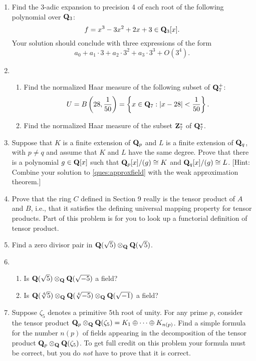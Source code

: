 \begin{enumerate}
\item Find the $3$-adic expansion to precision 4 of each root of the following polynomial over $\mathbf{Q}_3$:
$$
  f = x^3 - 3x^2 + 2x + 3 \in \mathbf{Q}_3[x].
$$
Your solution should conclude with three expressions of the form 
$$a_0 + a_1\cdot 3 + a_2\cdot 3^2 + a_3 \cdot 3^3 + O(3^4).$$

\item
\begin{enumerate}
\item Find the normalized Haar measure of the following subset of 
$\mathbf{Q}_7^+$:
$$
U = B\left(28,\frac{1}{50}\right) = 
\left\lbrace x\in \mathbf{Q}_7 : \left|x-28\right| < \frac{1}{50}\right\rbrace.
$$
\item
Find the normalized Haar measure of the subset $\mathbf{Z}_7^*$ of
$\mathbf{Q}_7^*$.
\end{enumerate} 


\item Suppose that $K$ is a finite extension of $\mathbf{Q}_p$ and $L$
is a finite extension of $\mathbf{Q}_q$, with $p\neq q$ and assume
that $K$ and $L$ have the same degree.  Prove that
there is a polynomial $g\in \mathbf{Q}[x]$ such that $\mathbf{Q}_p[x]/(g)\cong K$
and $\mathbf{Q}_q[x]/(g)\cong L$.  [Hint: Combine your solution to \ref{ques:approxfield} with the weak approximation theorem.]
 
\item Prove that the ring $C$ defined in Section 9 really is the tensor
product of $A$ and $B$, i.e., that it satisfies the defining universal
mapping property for tensor products.  Part of this problem is for you
to look up a functorial definition of tensor product.

\item Find a zero divisor pair in $\mathbf{Q}(\sqrt{5})\otimes_{\mathbf{Q}}\mathbf{Q}(\sqrt{5})$.

\item 
\begin{enumerate}
\item Is $\mathbf{Q}(\sqrt{5})\otimes_{\mathbf{Q}}\mathbf{Q}(\sqrt{-5})$ a field?
\item Is $\mathbf{Q}(\sqrt[4]{5})\otimes_{\mathbf{Q}}\mathbf{Q}(\sqrt[4]{-5})\otimes_{\mathbf{Q}}\mathbf{Q}(\sqrt{-1})$ a field?
\end{enumerate}

\item Suppose $\zeta_5$ denotes a primitive $5$th root of unity.  For
  any prime $p$, consider the tensor product $\mathbf{Q}_p \otimes_{\mathbf{Q}}
  \mathbf{Q}(\zeta_5) = K_1\oplus \cdots \oplus K_{n(p)}$.  Find a simple
  formula for the number $n(p)$ of fields appearing in the
  decomposition of the tensor product $\mathbf{Q}_p \otimes_{\mathbf{Q}} \mathbf{Q}(\zeta_5)$.
  To get full credit on this problem your formula must be correct, but
  you do {\em not} have to prove that it is correct.


\end{enumerate}
